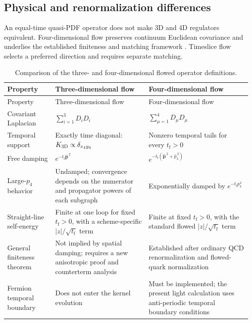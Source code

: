 \documentclass[11pt]{article}
\numberwithin{equation}{section}
\newcommand{\tf}{t_{\mathrm f}}
\begin{document}
\subsection{Physical and renormalization differences}

An equal-time quasi-PDF operator does not make 3D and 4D regulators
equivalent. Four-dimensional flow preserves continuum Euclidean covariance
and underlies the established finiteness and matching framework
\cite{Luscher2013,MonahanOrginos2017,Monahan2018}. Timeslice flow selects a
preferred direction and requires separate matching.

\begin{longtable}{
  >{\raggedright\arraybackslash}p{}
  >{\raggedright\arraybackslash}p{}
  >{\raggedright\arraybackslash}p{}}
  \caption{Comparison of the three- and four-dimensional flowed operator
  definitions.}\label{tab:3d-4d-comparison}\\
  \toprule
  Property & Three-dimensional flow & Four-dimensional flow \\
  \midrule
  \endfirsthead
  \toprule
  Property & Three-dimensional flow & Four-dimensional flow \\
  \midrule
  \endhead
  Covariant Laplacian
  & \(\sum_{i=1}^{3}D_iD_i\)
  & \(\sum_{\mu=1}^{4}D_\mu D_\mu\) \\
  Temporal support
  & Exactly time diagonal:
    \(K_{\rm 3D}\propto\delta_{x_4y_4}\)
  & Nonzero temporal tails for every \(\tf>0\) \\
  Free damping
  & \(e^{-\tf\widehat{\bm p}^{\,2}}\)
  & \(e^{-\tf(\widehat{\bm p}^{\,2}+\widehat p_4^{\,2})}\) \\
  Large-\(p_4\) behavior
  & Undamped; convergence depends on the numerator and propagator powers of
    each subgraph
  & Exponentially damped by \(e^{-\tf p_4^2}\) \\
  Straight-line self-energy
  & Finite at one loop for fixed \(\tf>0\), with a scheme-specific
    \(|z|/\sqrt{\tf}\) term
  & Finite at fixed \(\tf>0\), with the standard flowed
    \(|z|/\sqrt{\tf}\) term \\
  General finiteness theorem
  & Not implied by spatial damping; requires a new anisotropic proof and
    counterterm analysis
  & Established after ordinary QCD renormalization and flowed-quark
    normalization \\
  Fermion temporal boundary
  & Does not enter the kernel evolution
  & Must be implemented; the present light calculation uses anti-periodic
    temporal boundary conditions \\

\end{longtable}
\end{document}
